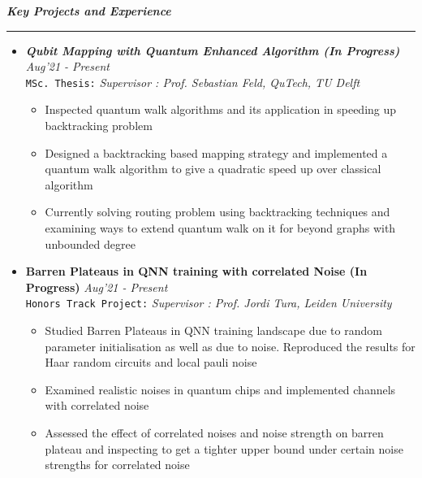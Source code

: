 \documentclass[11pt,a4paper]{article}
\begin{document}
\color{myBlue}
\vspace{0.2cm}
\noindent \Large\textbf{\textit{Key Projects and Experience}} \vspace{0.15cm} \normalsize
\color{gray} \hrule
\color{black}
\begin{itemize}
    \item \textbf{\textit{Qubit Mapping with Quantum Enhanced Algorithm (In Progress)}} \hfill \textit{Aug'21 - Present}\\
    \texttt{MSc. Thesis:} \textit{Supervisor : Prof. Sebastian Feld, QuTech, TU Delft}
    \begin{itemize}
        \item Inspected quantum walk algorithms and its application in speeding up backtracking problem
        \item Designed a backtracking based mapping strategy and implemented a quantum walk algorithm to give a quadratic speed up over classical algorithm
        \item Currently solving routing problem using backtracking techniques and examining ways to extend quantum walk on it for beyond graphs with unbounded degree
    \end{itemize}
    \item \textbf{Barren Plateaus in QNN training with correlated Noise (In Progress)} \hfill \textit{Aug'21 - Present} \\
    \texttt{Honors Track Project:} \textit{Supervisor : Prof. Jordi Tura, Leiden University}
    \begin{itemize}
        \item Studied Barren Plateaus in QNN training landscape due to random parameter initialisation as well as due to noise. Reproduced the results for Haar random circuits and local pauli noise
        \item Examined realistic noises in quantum chips and implemented channels with correlated noise
        \item Assessed the effect of correlated noises and noise strength on barren plateau and inspecting to get a tighter upper bound under certain noise strengths for correlated noise
    \end{itemize}


\end{itemize}
\end{document}
